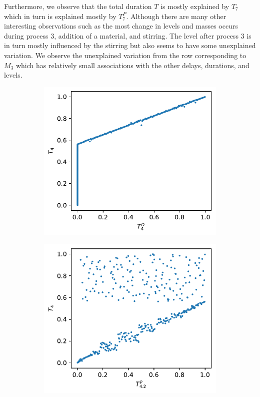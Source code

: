 \documentclass[../Thesis.tex]{subfiles}
\begin{document}
Furthermore, we observe that the total duration $T$ is mostly explained by $T_7$ which in turn is explained mostly by $T^P_7$. Although there are many other interesting observations such as the most change in levels and masses occurs during process $3$, addition of a material, and stirring. The level after process $3$ is in turn mostly influenced by the stirring but also seems to have some unexplained variation. We observe the unexplained variation from the row corresponding to $M_3$ which has relatively small associations with the other delays, durations, and levels.

\begin{figure}[H]
    \centering
    \begin{subfigure}[t]{0.49\linewidth}
        \includegraphics[width = .9\linewidth]{figures/Cycle data/G_dir complete - symmetric - TD4 vs T4.pdf}
        \caption{}
    \end{subfigure}
    \hfill
    \begin{subfigure}[t]{0.49\linewidth}
        \includegraphics[width = .9\linewidth]{figures/Cycle data/G_dir complete - symmetric - TP4 vs T4.pdf}

\end{subfigure}
\end{figure}
\end{document}
